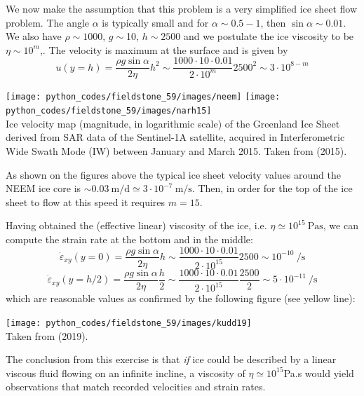 We now make the assumption that this problem is a very simplified ice sheet flow problem.
The angle $\alpha$ is typically small and for $\alpha\sim 0.5-1$\degree, then $\sin\alpha\sim 0.01$. 
We also have $\rho\sim1000$, $g\sim$10,  $h\sim2500$ and we postulate the 
ice viscosity to be $\eta\sim 10^m$,.
The velocity is maximum at the surface and is given by
\begin{equation}
u(y=h)=
\frac{\rho g \sin \alpha}{2 \eta}h^2 
\sim \frac{1000 \cdot 10 \cdot 0.01}{ 2\cdot 10^m}2500^2
\sim 3\cdot 10^{8-m}
\label{eq:ice1}
\end{equation}

\begin{center}
\texttt{[image: python\_codes/fieldstone\_59/images/neem]}
\texttt{[image: python\_codes/fieldstone\_59/images/narh15]}\\
{\captionfont Ice velocity map (magnitude, in logarithmic scale) of the Greenland Ice Sheet
derived from SAR data of the Sentinel-1A satellite, acquired in Interferometric Wide Swath
Mode (IW) between January and March 2015. Taken from \textcite{narh15} (2015).}
\end{center}

As shown on the figures above the typical ice sheet velocity values around the NEEM ice core 
is $\sim 0.03~\si{\meter\per\day} \simeq 3\cdot 10^{-7}~\si{\meter\per\second}$. 
Then, in order for the top of the ice sheet to flow at this speed it requires $m=15$.

Having obtained the (effective linear) viscosity of the ice, i.e. 
$\eta\simeq 10^{15}~\si{\pascal\second}$,
we can compute the strain rate at the bottom and in the middle:
\[
\dot{\varepsilon}_{xy}(y=0) 
= \frac{\rho g \sin \alpha}{2 \eta} h
\sim \frac{1000\cdot 10 \cdot 0.01}{2 \cdot 10^{15}}2500
\sim 10^{-10}~\si{\per\second}
\]
\[
\dot{\varepsilon}_{xy}(y=h/2) 
= \frac{\rho g \sin \alpha}{2 \eta} \frac{h}{2}
\sim \frac{1000\cdot 10 \cdot 0.01}{2 \cdot 10^{15}}\frac{2500}{2}
\sim 5\cdot 10^{-11}~\si{\per\second}
\]
which are reasonable values as confirmed by the following figure (see yellow line):  
\begin{center}
\texttt{[image: python\_codes/fieldstone\_59/images/kudd19]}\\
{\captionfont Taken from \textcite{kudd19} (2019).}
\end{center}

The conclusion from this exercise is that {\sl if} ice could be described by 
a linear viscous fluid flowing on an infinite incline, a viscosity of $\eta\simeq 10^{15}$Pa.s
would yield observations that match recorded velocities and strain rates. 


